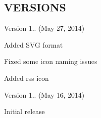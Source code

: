 \subsection*{V\+E\+R\+S\+I\+O\+NS}

Version 1.. (May 27, 2014)
\begin{DoxyItemize}
\item Added S\+VG format
\item Fixed some icon naming issues
\item Added rss icon
\end{DoxyItemize}

Version 1.. (May 16, 2014)
\begin{DoxyItemize}
\item Initial release 
\end{DoxyItemize}